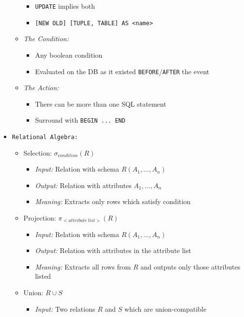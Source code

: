 \documentclass[landscape,8pt]{extarticle}
\newcommand{\code}{\lstinline}
\begin{document}
\begin{multicols}{4}
\begin{itemize}
\begin{itemize}
\begin{itemize}
            \item \code{UPDATE} implies both
            \item \code{[NEW OLD] [TUPLE, TABLE] AS <name>}
        \end{itemize}
        \item \emph{The Condition:}
        \begin{itemize}
            \item Any boolean condition
            \item Evaluated on the DB as it existed \code{BEFORE}/\code{AFTER} the event
        \end{itemize}
        \item \emph{The Action:}
        \begin{itemize}
            \item There can be more than one SQL statement
            \item Surround with \code{BEGIN ... END}
        \end{itemize}
    \end{itemize}
    \item \code{Relational Algebra:}
    \begin{itemize}
        \item Selection: $\sigma_{condition}(R)$
        \begin{itemize}
            \item \emph{Input:} Relation with schema $R(A_1, \dots, A_n)$
            \item \emph{Output:} Relation with attributes $A_1, \dots, A_n$
            \item \emph{Meaning:} Extracts only rows which satisfy condition
        \end{itemize}
        \item Projection: $\pi_{<attribute\ list>}(R)$
        \begin{itemize}
            \item \emph{Input:} Relation with schema $R(A_1, \dots, A_n)$
            \item \emph{Output:} Relation with attributes in the attribute list
            \item \emph{Meaning:} Extracts all rows from $R$ and outputs only those attributes listed
        \end{itemize}
            \item Union: $R \cup S$
            \begin{itemize}
                \item \emph{Input:} Two relations $R$ and $S$ which are union-compatible

\end{itemize}
\end{itemize}
\end{itemize}
\end{multicols}
\end{document}
